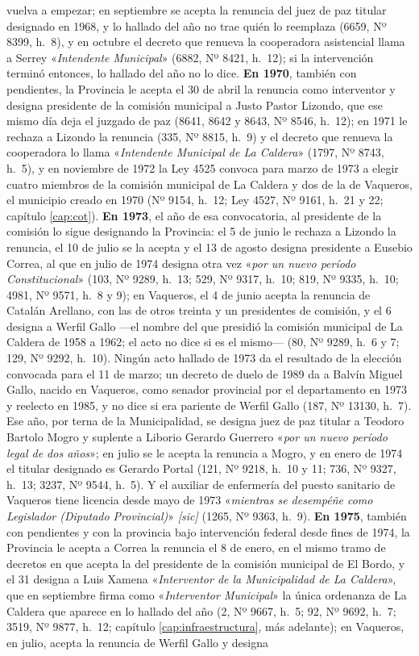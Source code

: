 vuelva a empezar; en septiembre se acepta la renuncia del juez de paz titular designado en 1968, y lo hallado del año no trae quién lo reemplaza (6659, Nº 8399, h.\ 8), y en octubre el decreto que renueva la cooperadora asistencial llama a Serrey «\textit{Intendente Municipal}» (6882, Nº 8421, h.\ 12); si la intervención terminó entonces, lo hallado del año no lo dice. \textbf{En 1970}, también con pendientes, la Provincia le acepta el 30 de abril la renuncia como interventor y designa presidente de la comisión municipal a Justo Pastor Lizondo, que ese mismo día deja el juzgado de paz (8641, 8642 y 8643, Nº 8546, h.\ 12); en 1971 le rechaza a Lizondo la renuncia (335, Nº 8815, h.\ 9) y el decreto que renueva la cooperadora lo llama «\textit{Intendente Municipal de La Caldera}» (1797, Nº 8743, h.\ 5), y en noviembre de 1972 la Ley 4525 convoca para marzo de 1973 a elegir cuatro miembros de la comisión municipal de La Caldera y dos de la de Vaqueros, el municipio creado en 1970 (Nº 9154, h.\ 12; Ley 4527, Nº 9161, h.\ 21 y 22; capítulo \ref{cap:cot}). \textbf{En 1973}, el año de esa convocatoria, al presidente de la comisión lo sigue designando la Provincia: el 5 de junio le rechaza a Lizondo la renuncia, el 10 de julio se la acepta y el 13 de agosto designa presidente a Eusebio Correa, al que en julio de 1974 designa otra vez «\textit{por un nuevo período Constitucional}» (103, Nº 9289, h.\ 13; 529, Nº 9317, h.\ 10; 819, Nº 9335, h.\ 10; 4981, Nº 9571, h.\ 8 y 9); en Vaqueros, el 4 de junio acepta la renuncia de Catalán Arellano, con las de otros treinta y un presidentes de comisión, y el 6 designa a Werfil Gallo ---el nombre del que presidió la comisión municipal de La Caldera de 1958 a 1962; el acto no dice si es el mismo--- (80, Nº 9289, h.\ 6 y 7; 129, Nº 9292, h.\ 10). Ningún acto hallado de 1973 da el resultado de la elección convocada para el 11 de marzo; un decreto de duelo de 1989 da a Balvín Miguel Gallo, nacido en Vaqueros, como senador provincial por el departamento en 1973 y reelecto en 1985, y no dice si era pariente de Werfil Gallo (187, Nº 13130, h.\ 7). Ese año, por terna de la Municipalidad, se designa juez de paz titular a Teodoro Bartolo Mogro y suplente a Liborio Gerardo Guerrero «\textit{por un nuevo período legal de dos años}»; en julio se le acepta la renuncia a Mogro, y en enero de 1974 el titular designado es Gerardo Portal (121, Nº 9218, h.\ 10 y 11; 736, Nº 9327, h.\ 13; 3237, Nº 9544, h.\ 5). Y el auxiliar de enfermería del puesto sanitario de Vaqueros tiene licencia desde mayo de 1973 «\textit{mientras se desempéñe como Legislador (Diputado Provincial)}» \textit{[sic]} (1265, Nº 9363, h.\ 9). \textbf{En 1975}, también con pendientes y con la provincia bajo intervención federal desde fines de 1974, la Provincia le acepta a Correa la renuncia el 8 de enero, en el mismo tramo de decretos en que acepta la del presidente de la comisión municipal de El Bordo, y el 31 designa a Luis Xamena «\textit{Interventor de la Municipalidad de La Caldera}», que en septiembre firma como «\textit{Interventor Municipal}» la única ordenanza de La Caldera que aparece en lo hallado del año (2, Nº 9667, h.\ 5; 92, Nº 9692, h.\ 7; 3519, Nº 9877, h.\ 12; capítulo \ref{cap:infraestructura}, más adelante); en Vaqueros, en julio, acepta la renuncia de Werfil Gallo y designa 